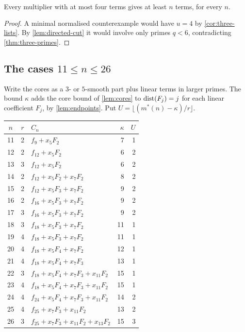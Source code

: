 \begin{corollary}\label{cor:four-lists}
Every multiplier with at most four terms gives at least $n$ terms, for every $n$.
\end{corollary}

\begin{proof}
A minimal normalised counterexample would have $u=4$ by \cref{cor:three-lists}. By \cref{lem:directed-cut} it would involve only primes $q<6$, contradicting \cref{thm:three-primes}.
\end{proof}

\subsection{The cases \texorpdfstring{$11\le n\le26$}{11 <= n <= 26}}
Write the cores as a $3$- or $5$-smooth part plus linear terms in larger primes. The bound $\kappa$ adds the core bound of \cref{lem:cores} to $\operatorname{dist}(F_j)=j$ for each linear coefficient $F_j$, by \cref{lem:endpoints}. Put $U=\lfloor(m^*(n)-\kappa)/r\rfloor$.

\smallskip
\begin{center}\small
\begin{tabular}{c|c|l|r|r}
$n$&$r$&$C_n$&$\kappa$&$U$\\\hline
11&2&$f_9+x_5F_2$&7&1\\
12&2&$f_{12}+x_5F_2$&6&2\\
13&3&$f_{12}+x_5F_2$&6&2\\
14&2&$f_{12}+x_5F_2+x_7F_2$&8&2\\
15&2&$f_{12}+x_5F_3+x_7F_2$&9&2\\
16&2&$f_{16}+x_5F_3+x_7F_2$&9&2\\
17&3&$f_{16}+x_5F_3+x_7F_2$&9&2\\
18&3&$f_{18}+x_5F_3+x_7F_2$&11&1\\
19&4&$f_{18}+x_5F_3+x_7F_2$&11&1\\
20&4&$f_{18}+x_5F_4+x_7F_2$&12&1\\
21&4&$f_{18}+x_5F_4+x_7F_3$&13&1\\
22&3&$f_{18}+x_5F_4+x_7F_3+x_{11}F_2$&15&1\\
23&4&$f_{18}+x_5F_4+x_7F_3+x_{11}F_2$&15&1\\
24&4&$f_{24}+x_5F_4+x_7F_3+x_{11}F_2$&14&2\\
25&4&$f_{25}+x_7F_3+x_{11}F_2$&13&2\\
26&3&$f_{25}+x_7F_3+x_{11}F_2+x_{13}F_2$&15&3
\end{tabular}
\end{center}
\smallskip

